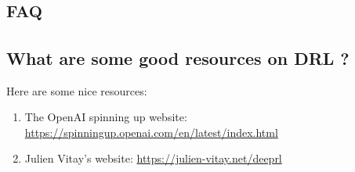\chapter{\textsc{faq}}

\section{What are some good resources on DRL ?}

Here are some nice resources:

\begin{enumerate}
	\item The OpenAI spinning up website: \url{https://spinningup.openai.com/en/latest/index.html}
	\item Julien Vitay's website: \url{https://julien-vitay.net/deeprl}
\end{enumerate}
